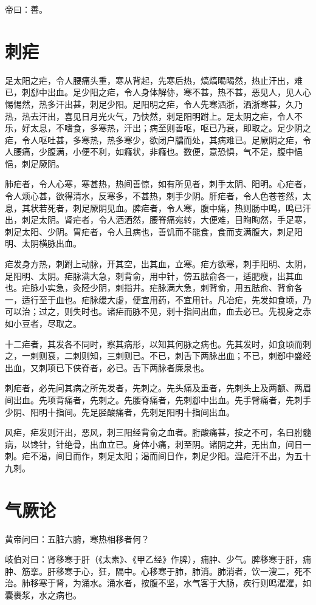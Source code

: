 \documentclass{article}%
\begin{document}
帝曰：善。
\section{刺疟}
足太阳之疟，令人腰痛头重，寒从背起，先寒后热，熇熇暍暍然，热止汗出，难已，刺郄中出血。足少阳之疟，令人身体解㑊，寒不甚，热不甚，恶见人，见人心惕惕然，热多汗出甚，刺足少阳。足阳明之疟，令人先寒洒浙，洒浙寒甚，久乃热，热去汗出，喜见日月光火气，乃快然，刺足阳明跗上。足太阴之疟，令人不乐，好太息，不嗜食，多寒热，汗出；病至则善呕，呕已乃衰，即取之。足少阴之疟，令人呕吐甚，多寒热，热多寒少，欲闭户牖而处，其病难已。足厥阴之疟，令人腰痛，少腹满，小便不利，如癃状，非癃也。数便，意恐惧，气不足，腹中悒悒，刺足厥阴。

肺疟者，令人心寒，寒甚热，热间善惊，如有所见者，刺手太阴、阳明。心疟者，令人烦心甚，欲得清水，反寒多，不甚热，刺手少阴。肝疟者，令人色苍苍然，太息，其状若死者，刺足厥阴见血。脾疟者，令人寒，腹中痛，热则肠中鸣，鸣已汗出，刺足太阴。肾疟者，令人洒洒然，腰脊痛宛转，大便难，目眴眴然，手足寒，刺足太阳、少阴。胃疟者，令人且病也，善饥而不能食，食而支满腹大，刺足阳明、太阴横脉出血。

疟发身方热，刺跗上动脉，开其空，出其血，立寒。疟方欲寒，刺手阳明、太阴，足阳明、太阴。疟脉满大急，刺背俞，用中针，傍五胠俞各一，适肥瘦，出其血也。疟脉小实急，灸陉少阴，刺指井。疟脉满大急，刺背俞，用五胠俞、背俞各一，适行至于血也。疟脉缓大虚，便宜用药，不宜用针。凡冶疟，先发如食顷，乃可以治；过之，则失时也。诸疟而脉不见，刺十指间出血，血去必已。先视身之赤如小豆者，尽取之。

十二疟者，其发各不同时，察其病形，以知其何脉之病也。先其发时，如食顷而刺之，一刺则衰，二刺则知，三刺则已。不已，刺舌下两脉出血；不已，刺郄中盛经出血，又刺项已下侠脊者，必已。舌下两脉者廉泉也。

刺疟者，必先问其病之所先发者，先刺之。先头痛及重者，先刺头上及两额、两眉间出血。先项背痛者，先刺之。先腰脊痛者，先刺郄中出血。先手臂痛者，先刺手少阴、阳明十指间。先足胫酸痛者，先刺足阳明十指间出血。

风疟，疟发则汗出，恶风，刺三阳经背俞之血者。胻酸痛甚，按之不可，名曰胕髓病，以馋针，针绝骨，出血立已。身体小痛，刺至阴。诸阴之井，无出血，间日一刺。疟不渴，间日而作，刺足太阳；渴而间日作，刺足少阳。温疟汗不出，为五十九刺。
\section{气厥论}
黄帝问曰：五脏六腑，寒热相移者何？

岐伯对曰：肾移寒于肝（《太素》、《甲乙经》作脾），痈肿、少气。脾移寒于肝，痈肿、筋挛。肝移寒于心，狂，隔中。心移寒于肺，肺消。肺消者，饮一溲二，死不治。肺移寒于肾，为涌水。涌水者，按腹不坚，水气客于大肠，疾行则鸣濯濯，如囊裹浆，水之病也。
\end{document}
